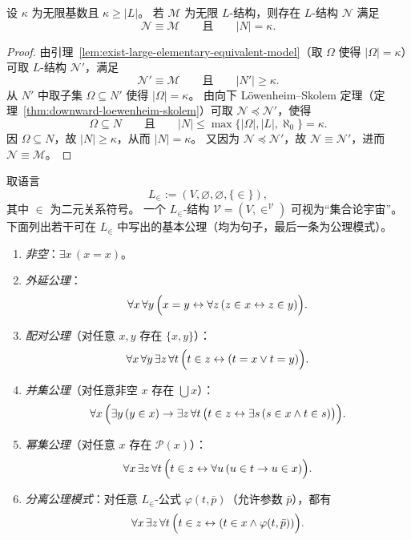 \documentclass[lang=cn,a4paper,newtx,section]{elegantbook}
\begin{document}
 \begin{theorem}
 \label{cardinal-loewenheim-skolem}
 设 $\kappa$ 为无限基数且 $\kappa\ge\lvert L\rvert$。
 若 $\mathcal M$ 为无限 $L$-结构，则存在 $L$-结构 $\mathcal N$ 满足
 \[
   \mathcal N\equiv\mathcal M\qquad\text{且}\qquad \lvert N\rvert=\kappa.
 \]
 \end{theorem}

 \begin{proof}
 由引理~\ref{lem:exist-large-elementary-equivalent-model}（取 $\Omega$ 使得 $\lvert\Omega\rvert=\kappa$）可取 $L$-结构 $\mathcal N'$，满足
 \[
   \mathcal N'\equiv\mathcal M\qquad\text{且}\qquad \lvert N'\rvert\ge\kappa.
 \]
 从 $N'$ 中取子集 $\Omega\subseteq N'$ 使得 $\lvert\Omega\rvert=\kappa$。
 由向下 Löwenheim--Skolem 定理（定理~\ref{thm:downward-loewenheim-skolem}）可取 $\mathcal N\preccurlyeq\mathcal N'$，使得
 \[
   \Omega\subseteq N\qquad\text{且}\qquad \lvert N\rvert\le \max\{\lvert\Omega\rvert,\lvert L\rvert,\aleph_0\}=\kappa.
 \]
 因 $\Omega\subseteq N$，故 $\lvert N\rvert\ge\kappa$，从而 $\lvert N\rvert=\kappa$。
 又因为 $\mathcal N\preccurlyeq\mathcal N'$，故 $\mathcal N\equiv\mathcal N'$，进而 $\mathcal N\equiv\mathcal M$。
 \end{proof}

 \begin{example}[集合论的一阶公理化]
 取语言
 \[
   L_{\in}:=(V,\varnothing,\varnothing,\{\in\}),
 \]
 其中 $\in$ 为二元关系符号。
 一个 $L_{\in}$-结构 $\mathcal V=(V,\in^{\mathcal V})$ 可视为“集合论宇宙”。
 下面列出若干可在 $L_{\in}$ 中写出的基本公理（均为句子，最后一条为公理模式）。

 \begin{enumerate}
   \item \emph{非空}：$\exists x\,(x=x)$。
   \item \emph{外延公理}：
   \[
     \forall x\,\forall y\,\Bigl(x=y\leftrightarrow\forall z\,(z\in x\leftrightarrow z\in y)\Bigr).
   \]
   \item \emph{配对公理}（对任意 $x,y$ 存在 $\{x,y\}$）：
   \[
     \forall x\,\forall y\,\exists z\,\forall t\,\Bigl(t\in z\leftrightarrow(t=x\vee t=y)\Bigr).
   \]
   \item \emph{并集公理}（对任意非空 $x$ 存在 $\bigcup x$）：
   \[
     \forall x\,\Bigl(\exists y\,(y\in x)\to\exists z\,\forall t\,\bigl(t\in z\leftrightarrow\exists s\,(s\in x\wedge t\in s)\bigr)\Bigr).
   \]
   \item \emph{幂集公理}（对任意 $x$ 存在 $\mathcal P(x)$）：
   \[
     \forall x\,\exists z\,\forall t\,\Bigl(t\in z\leftrightarrow\forall u\,(u\in t\to u\in x)\Bigr).
   \]
   \item \emph{分离公理模式}：对任意 $L_{\in}$-公式 $\varphi(t,\bar p)$（允许参数 $\bar p$），都有
   \[
     \forall x\,\exists z\,\forall t\,\Bigl(t\in z\leftrightarrow(t\in x\wedge\varphi(t,\bar p))\Bigr).
   \]
 \end{enumerate}
 \end{example}
\end{document}
